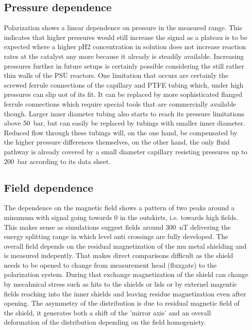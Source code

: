         \subsection{Pressure dependence}
            Polarization shows a linear dependence on pressure in the measured range. This indicates that higher pressures would still increase the signal as a plateau is to be expected where a higher pH2 concentration in solution does not increase reaction rates at the catalyst any more because it already is steadily available. Increasing pressures further in future setups is certainly possible considering the still rather thin walls of the PSU reactors. One limitation that occurs are certainly the screwed ferrule connections of the capillary and PTFE tubing which, under high pressures can slip uot of its fit. It can be replaced by more sophisticated flanged ferrule connections which require special tools that are commercially available though. Larger inner diameter tubing also starts to reach its pressure limitations above \SI{50}{\bar}, but can easily be replaced by tubings with smaller inner diameter. Reduced flow through these tubings will, on the one hand, be compensated by the higher pressure differences themselves, on the other hand, the only fluid pathway is already covered by a small diameter capillary resisting pressures up to \SI{200}{\bar} according to its data sheet.
        \subsection{Field dependence}
            The dependence on the magnetic field shows a pattern of two peaks around a minumum with signal going towards 0 in the outskirts, i.e. towards high fields. This makes sense as simulations suggest fields around \SI{300}{\nano\tesla} delivering the energy splitting range in which level anti crossings are fully developed. The overall field depends on the residual magnetization of the mu metal shielding and is measured indepently. That makes direct comparisons difficult as the shield needs to be opened to change from measurement head (fluxgate) to the polarization system. During that exchange magnetization of the shield can change by mecahnical stress such as hits to the shields or lids or by externel magentic fields reaching into the inner shields and leaving residue magnetization even after opening. The asymmetry of the distribution is due to residual magnetic field of the shield, it generates both a shift of the 'mirror axis' and an overall deformation of the distribution depending on the field homogeniety.

